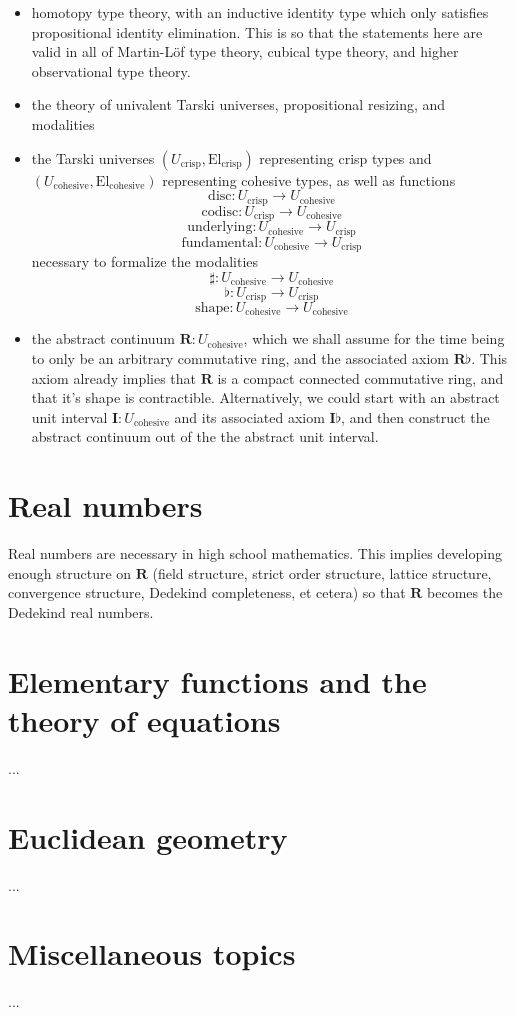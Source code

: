 \documentclass[one]{article}
\begin{document}
\begin{itemize}
\item homotopy type theory, with an inductive identity type which only satisfies propositional identity elimination. This is so that the statements here are valid in all of Martin-Löf type theory, cubical type theory, and higher observational type theory. 

\item the theory of univalent Tarski universes, propositional resizing, and modalities

\item the Tarski universes $(U_\mathrm{crisp}, \mathrm{El}_\mathrm{crisp})$ representing crisp types and $(U_\mathrm{cohesive}, \mathrm{El}_\mathrm{cohesive})$ representing cohesive types, as well as functions 
$$\mathrm{disc}:U_\mathrm{crisp} \to U_\mathrm{cohesive}$$ 
$$\mathrm{codisc}:U_\mathrm{crisp} \to U_\mathrm{cohesive}$$
$$\mathrm{underlying}:U_\mathrm{cohesive} \to U_\mathrm{crisp}$$ 
$$\mathrm{fundamental}:U_\mathrm{cohesive} \to U_\mathrm{crisp}$$ 
necessary to formalize the modalities 
$$\sharp:U_\mathrm{cohesive} \to U_\mathrm{cohesive}$$
$$\flat:U_\mathrm{crisp} \to U_\mathrm{crisp}$$
$$\mathrm{shape}:U_\mathrm{cohesive} \to U_\mathrm{cohesive}$$

\item the abstract continuum $\mathbf{R}:U_\mathrm{cohesive}$, which we shall assume for the time being to only be an arbitrary commutative ring, and the associated axiom $\mathbf{R} \flat$. This axiom already implies that $\mathbf{R}$ is a compact connected commutative ring, and that it's shape is contractible. Alternatively, we could start with an abstract unit interval $\mathbf{I}:U_\mathrm{cohesive}$ and its associated axiom $\mathbf{I} \flat$, and then construct the abstract continuum out of the the abstract unit interval. 
\end{itemize}

\section{Real numbers}

Real numbers are necessary in high school mathematics. This implies developing enough structure on $\mathbf{R}$ (field structure, strict order structure, lattice structure, convergence structure, Dedekind completeness, et cetera) so that $\mathbf{R}$ becomes the Dedekind real numbers. 

\section{Elementary functions and the theory of equations}

...

\section{Euclidean geometry}

...

\section{Miscellaneous topics}

...
\end{document}
